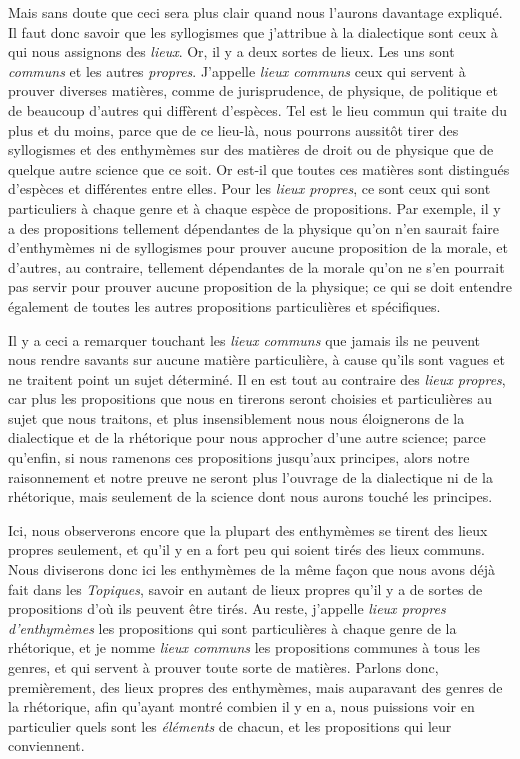 Mais sans doute que ceci sera plus clair quand nous l'aurons davantage expliqué. Il faut donc savoir que les syllogismes que j'attribue à la dialectique
sont ceux à qui nous assignons des \emph{lieux}. Or, il y a deux sortes de lieux. Les uns sont \emph{communs} et les autres \emph{propres}. J'appelle
\emph{lieux communs} ceux qui servent à prouver diverses matières, comme de jurisprudence, de physique, de politique et de beaucoup d'autres qui diffèrent
d'espèces. Tel est le lieu commun qui traite du plus et du moins, parce que de ce lieu-là, nous pourrons aussitôt tirer des syllogismes et des enthymèmes
sur des matières de droit ou de physique que de quelque autre science que ce soit. Or est-il que toutes ces matières sont distingués d'espèces et
différentes entre elles. Pour les \emph{lieux propres}, ce sont ceux qui sont particuliers à chaque genre et à chaque espèce de propositions. Par exemple,
il y a des propositions tellement dépendantes de la physique qu'on n'en saurait faire d'enthymèmes ni de syllogismes pour prouver aucune proposition de la
morale, et d'autres, au contraire, tellement dépendantes de la morale qu'on ne s'en pourrait pas servir pour prouver aucune proposition de la physique; ce
qui se doit entendre également de toutes les autres propositions particulières et spécifiques.

\bigbreak

Il y a ceci a remarquer touchant les \emph{lieux communs} que jamais ils ne peuvent nous rendre savants sur aucune matière particulière, à cause qu'ils
sont vagues et ne traitent point un sujet déterminé. Il en est tout au contraire des \emph{lieux propres}, car plus les propositions que nous en tirerons
seront choisies et particulières au sujet que nous traitons, et plus insensiblement nous nous éloignerons de la dialectique et de la rhétorique pour nous
approcher d'une autre science; parce qu'enfin, si nous ramenons ces propositions jusqu'aux principes, alors notre raisonnement et notre preuve ne seront
plus l'ouvrage de la dialectique ni de la rhétorique, mais seulement de la science dont nous aurons touché les principes. 

Ici, nous observerons encore que la plupart des enthymèmes se tirent des lieux propres seulement, et qu'il y en a fort peu qui soient tirés des lieux
communs. Nous diviserons donc ici les enthymèmes de la même façon que nous avons déjà fait dans les \emph{Topiques}, savoir en autant de lieux propres
qu'il y a de sortes de propositions d'où ils peuvent être tirés. Au reste, j'appelle \emph{lieux propres d'enthymèmes} les propositions qui sont
particulières à chaque genre de la rhétorique, et je nomme \emph{lieux communs} les propositions communes à tous les genres, et qui servent à prouver
toute sorte de matières. Parlons donc, premièrement, des lieux propres des enthymèmes, mais auparavant des genres de la rhétorique, afin qu'ayant montré
combien il y en a, nous puissions voir en particulier quels sont les \emph{éléments} de chacun, et les propositions qui leur conviennent.

